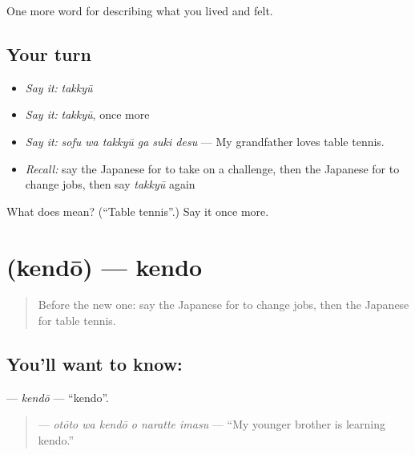 \begin{grammarlens}[title={What you've built}]
One more word for describing what you lived and felt.
\end{grammarlens}

\subsection*{Your turn}
\begin{itemize}
\raggedright
  \item \emph{Say it:} \emph{takkyū}
  \item \emph{Say it:} \emph{takkyū}, once more
  \item \emph{Say it:} \emph{sofu wa takkyū ga suki desu} — My grandfather loves table tennis.
  \item \emph{Recall:} say the Japanese for to take on a challenge, then the Japanese for to change jobs, then say \emph{takkyū} again
\end{itemize}

\begin{tcolorbox}[breakable,colback=teal!4,colframe=teal!35!black,title={Before you move on}]
What does  mean? (\textquotedblleft{}Table tennis\textquotedblright{}.) Say it once more.
\end{tcolorbox}
\section[\texorpdfstring{\ja{けんどう} (kendō)}{けんどう (kendō)}]{ (kendō) — kendo}

\label{lesson:JA-C461-kendou}



\begin{quote}
Before the new one: say the Japanese for to change jobs, then the Japanese for table tennis.
\end{quote}

\subsection*{You'll want to know: }
\textbf{} — \emph{kendō} — \textquotedblleft{}kendo\textquotedblright{}.

\begin{quote}
\textbf{  } — \emph{otōto wa kendō o naratte imasu} — \textquotedblleft{}My younger brother is learning kendo.\textquotedblright{}
\end{quote}

